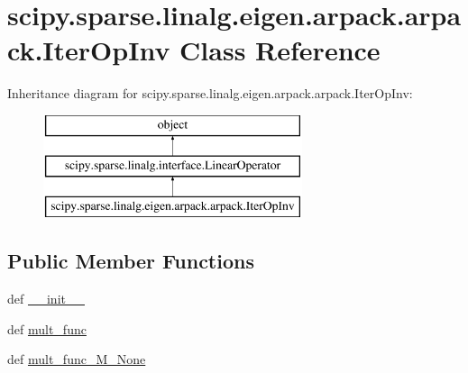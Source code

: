 \hypertarget{classscipy_1_1sparse_1_1linalg_1_1eigen_1_1arpack_1_1arpack_1_1IterOpInv}{}\section{scipy.\+sparse.\+linalg.\+eigen.\+arpack.\+arpack.\+Iter\+Op\+Inv Class Reference}
\label{classscipy_1_1sparse_1_1linalg_1_1eigen_1_1arpack_1_1arpack_1_1IterOpInv}
Inheritance diagram for scipy.\+sparse.\+linalg.\+eigen.\+arpack.\+arpack.\+Iter\+Op\+Inv\+:\begin{figure}[H]
\begin{center}
\leavevmode
\includegraphics[height=3.000000cm]{classscipy_1_1sparse_1_1linalg_1_1eigen_1_1arpack_1_1arpack_1_1IterOpInv}
\end{center}
\end{figure}
\subsection*{Public Member Functions}
\begin{DoxyCompactItemize}
\item 
def \hyperlink{classscipy_1_1sparse_1_1linalg_1_1eigen_1_1arpack_1_1arpack_1_1IterOpInv_ad2e42304962011fa43b0b7ebe6694091}{\+\_\+\+\_\+init\+\_\+\+\_\+}
\item 
def \hyperlink{classscipy_1_1sparse_1_1linalg_1_1eigen_1_1arpack_1_1arpack_1_1IterOpInv_ae11d0d52ead126cbd4438a1cdca164bd}{mult\+\_\+func}
\item 
def \hyperlink{classscipy_1_1sparse_1_1linalg_1_1eigen_1_1arpack_1_1arpack_1_1IterOpInv_a2381c8ebda67f6aabc37c4c7fea186ae}{mult\+\_\+func\+\_\+\+M\+\_\+\+None}
\end{DoxyCompactItemize}
